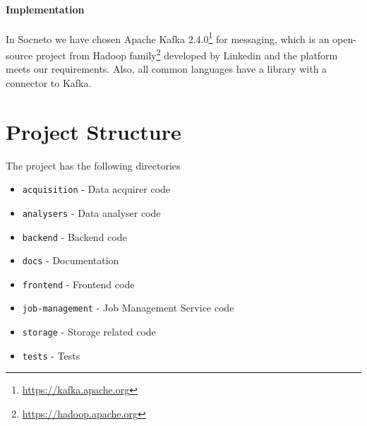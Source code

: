 \paragraph{Implementation}

In Socneto we have chosen Apache Kafka 2.4.0\footnote{\url{https://kafka.apache.org}} for messaging, which is an open-source project from Hadoop family\footnote{\url{https://hadoop.apache.org}} developed by Linkedin and the platform meets our requirements. Also, all common languages have a library with a connector to  Kafka.

\section{Project Structure}\label{section:projectStructure}

The project has the following directories
\begin{itemize}
    \item \texttt{acquisition} - Data acquirer code
    \item \texttt{analysers} - Data analyser code
    \item \texttt{backend} - Backend code
    \item \texttt{docs} - Documentation
    \item \texttt{frontend} - Frontend code
    \item \texttt{job-management} - Job Management Service code
    \item \texttt{storage} - Storage related code
    \item \texttt{tests} - Tests
\end{itemize}